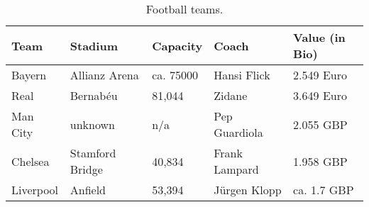 \begin{table}[t]
\centering
\caption[]{
Football teams.}
\label{table:ExampleTable}
\vspace{\tsq}
{\footnotesize
\begin{tabular}{|l|l|l|l|l|}\hline
Team & Stadium & Capacity & Coach & Value (in Bio) \\ \hline
Bayern & Allianz Arena & ca. 75000 & Hansi Flick &  2.549 Euro \\ 
Real & Bernab\'{e}u & 81,044 & Zidane &  3.649 Euro \\ 
Man City & unknown & n/a & Pep Guardiola & 2.055 GBP \\ 
Chelsea & Stamford Bridge & 40,834 & Frank Lampard & 1.958 GBP  \\ 
Liverpool & Anfield & 53,394 & J\"urgen Klopp & ca. 1.7 GBP    \\ 
\hline

\end{tabular}
}%
	
\end{table}
